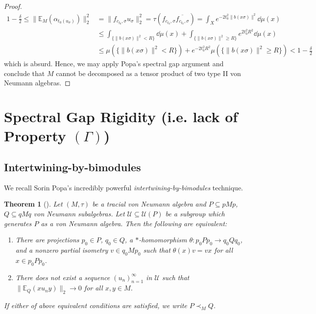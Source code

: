 \documentclass[a4paper,11pt]{article}
\numberwithin{equation}{section}
\newtheorem{thm}{Theorem}[section]
\theoremstyle{definition}
\theoremstyle{remark}
\numberwithin{equation}{section}
\newcommand{\E}{\mathbb{E}}
\newcommand{\U}{\mathcal{U}}
\def\sub{\subseteq}
\providecommand{\norm}[1]{\lVert#1\rVert}
\newcommand*\cls[1]{\overline{#1}}
\numberwithin{equation}{section}
\begin{document}
\begin{proof}
    \begin{align*}
        1-\frac{\delta}{2} \leq \norm{\E_{M}(\alpha_{t_{0}(u_{\sigma})})}_{2}^{2} &= \norm{f_{c_{t_0},\sigma}u_{\sigma}}_{2}^{2} = \tau ( f_{c_{t_{0}},\sigma} \cls{ f_{c_{t_{0}},\sigma}}) = \int_{X} e^{-2t_{0}^2 \norm{b(x \sigma)}^{2}} \dd{\mu(x)} \\
        &\leq \int_{\{\norm{b(x \sigma)}^{2}< R\}} \dd{\mu(x)} + \int_{\{\norm{b(x \sigma)}^{2} \geq R\}}e^{2t_{0}^{2}R^{2}}\dd{\mu(x)}\\
        &\leq \mu(\{\norm{b(x \sigma)}^{2}< R\}) + e^{-2t_{0}^{2}R^{2}} \mu(\{\norm{b(x \sigma)}^{2}\geq R\})  < 1- \frac{\delta}{2}
    \end{align*}
    which is absurd. Hence, we may apply Popa's spectral gap argument and conclude that $ M $ cannot be decomposed as a tensor product of two type II von Neumann algebras.


\end{proof}


\section{Spectral Gap Rigidity (i.e. lack of Property $(\Gamma)$)}
\subsection{Intertwining-by-bimodules}
We recall Sorin Popa's incredibly powerful \textit{intertwining-by-bimodules} technique.
\begin{thm}[\cite{popa:03}]
    Let $ (M,\tau) $ be a tracial von Neumann algebra and $ P\sub pMp $, $ Q\sub qMq $ von Neumann subalgebras. Let $ \U\sub \U(P) $ be a subgroup which generates $ P $ as a von Neumann algebra. Then the following are equivalent:
    \begin{enumerate}
        \item There are projections $ p_{0}\in P $, $ q_{0}\in Q $, a $ * $-homomorphism $ \theta:p_{0}Pp_{0}\to q_{0}Qq_{0} $, and a nonzero partial isometry $ v\in q_{0}Mp_{0} $ such that $ \theta(x)v = vx $ for all $ x\in p_{0}Pp_{0} $.
        \item There does not exist a sequence $ (u_{n})_{n=1}^{\infty} $ in $ \U $ such that $ \norm{\E_{Q}(xu_{n}y)}_{2}\to0 $ for all $ x,y\in M $.
    \end{enumerate}
    If either of above equivalent conditions are satisfied, we write $ P\prec_{M}Q $.
\end{thm}
\end{document}

